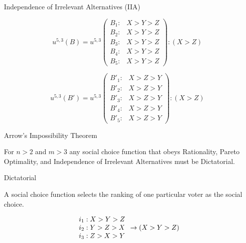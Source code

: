 \documentclass{beamer}
\begin{document}
\begin{frame}{Independence of Irrelevant Alternatives (IIA)}
    \begin{definition}
        


    \small \begin{equation*}
  u^{5,3}(B) = u^{5,3}\left(
    \begin{array}{cc}
      B_1: & \text{$X > Y > Z$}\\
      B_2: & \text{$X > Y > Z$}\\
      B_3: & \text{$X > Y > Z$}\\
      B_4: & \text{$X > Y > Z$}\\ 
      B_5: & \text{$X > Y > Z$}
    \end{array} 
    \right): (X > Z)
\end{equation*}

\vskip 0.25cm

\small \begin{equation*}
  u^{5,3}(B') = u^{5,3}\left(
    \begin{array}{cc}
      B'_1: & \text{$X > Z > Y$}\\
      B'_2: & \text{$X > Z > Y$}\\
      B'_3: & \text{$X > Z > Y$}\\
      B'_4: & \text{$X > Z > Y$}\\ 
      B'_5: & \text{$X > Z > Y$}
    \end{array} 
    \right): (X > Z)
\end{equation*}
    \end{definition}
\end{frame}


\begin{frame}{Arrow's Impossibility Theorem}
    \begin{theorem}
    For $n > 2$ and $m > 3$ any social choice function that obeys Rationality, Pareto Optimality, and Independence of Irrelevant Alternatives must be Dictatorial.
    \end{theorem}
\end{frame}

\begin{frame}{Dictatorial}
    \begin{definition}[Dictatorial]
        A social choice function selects the ranking of one particular voter as the social choice.
    \end{definition}


\huge \begin{equation*}
    \begin{array}{cc}
      \huge i_1: X > Y > Z \\
    \huge i_2: Y > Z > X \\
    \huge i_3: Z > X > Y
    \end{array} 
    \rightarrow (X > Y > Z)
\end{equation*}
\end{frame}
\end{document}
